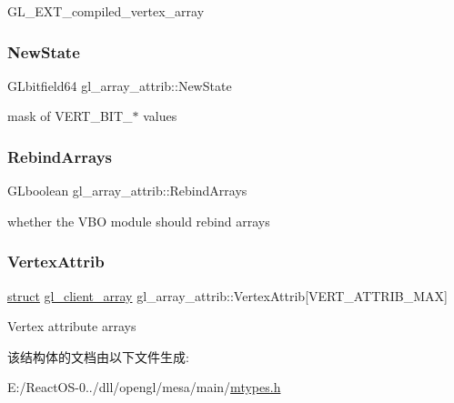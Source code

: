 G\+L\+\_\+\+E\+X\+T\+\_\+compiled\+\_\+vertex\+\_\+array \mbox{\label{structgl__array__attrib_a937523db48918ec8c595de0888bfe4b8}} 
\subsubsection{\texorpdfstring{New\+State}{NewState}}
{\footnotesize\ttfamily G\+Lbitfield64 gl\+\_\+array\+\_\+attrib\+::\+New\+State}

mask of V\+E\+R\+T\+\_\+\+B\+I\+T\+\_\+$\ast$ values \mbox{\label{structgl__array__attrib_a0804b68b6f651b7d2a4084a7372e5c0e}} 
\subsubsection{\texorpdfstring{Rebind\+Arrays}{RebindArrays}}
{\footnotesize\ttfamily G\+Lboolean gl\+\_\+array\+\_\+attrib\+::\+Rebind\+Arrays}

whether the V\+BO module should rebind arrays \mbox{\label{structgl__array__attrib_aaf500971e8398c4136ec4efd851619cc}} 
\subsubsection{\texorpdfstring{Vertex\+Attrib}{VertexAttrib}}
{\footnotesize\ttfamily \hyperlink{interfacestruct}{struct} \hyperlink{structgl__client__array}{gl\+\_\+client\+\_\+array} gl\+\_\+array\+\_\+attrib\+::\+Vertex\+Attrib\mbox{[}V\+E\+R\+T\+\_\+\+A\+T\+T\+R\+I\+B\+\_\+\+M\+AX\mbox{]}}

Vertex attribute arrays 

该结构体的文档由以下文件生成\+:\begin{DoxyCompactItemize}
\item 
E\+:/\+React\+O\+S-\/0../dll/opengl/mesa/main/\hyperlink{mtypes_8h}{mtypes.\+h}\end{DoxyCompactItemize}
